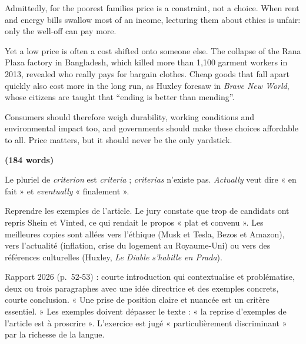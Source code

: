 \documentclass[11pt,a4paper]{article}
\begin{document}
Admittedly, for the poorest families price is a constraint, not a choice. When rent and energy bills swallow most of an income, lecturing them about ethics is unfair: only the well-off can pay more.

Yet a low price is often a cost shifted onto someone else. The collapse of the Rana Plaza factory in Bangladesh, which killed more than 1,100 garment workers in 2013, revealed who really pays for bargain clothes. Cheap goods that fall apart quickly also cost more in the long run, as Huxley foresaw in \emph{Brave New World}, whose citizens are taught that ``ending is better than mending''.

Consumers should therefore weigh durability, working conditions and environmental impact too, and governments should make these choices affordable to all. Price matters, but it should never be the only yardstick.

\textbf{(184 words)}

\begin{piege}

Le pluriel de \emph{criterion} est \emph{criteria} ; \emph{criterias} n'existe pas. \emph{Actually} veut dire « en fait » et \emph{eventually} « finalement ».

\end{piege}

\begin{piege}

Reprendre les exemples de l'article. Le jury constate que trop de candidats ont repris Shein et Vinted, ce qui rendait le propos « plat et convenu ». Les meilleures copies sont allées vers l'éthique (Musk et Tesla, Bezos et Amazon), vers l'actualité (inflation, crise du logement au Royaume-Uni) ou vers des références culturelles (Huxley, \emph{Le Diable s'habille en Prada}).

\end{piege}

\begin{jury}

Rapport 2026 (p.~52-53) : courte introduction qui contextualise et problématise, deux ou trois paragraphes avec une idée directrice et des exemples concrets, courte conclusion. « Une prise de position claire et nuancée est un critère essentiel. » Les exemples doivent dépasser le texte : « la reprise d'exemples de l'article est à proscrire ». L'exercice est jugé « particulièrement discriminant » par la richesse de la langue.

\end{jury}
\end{document}
